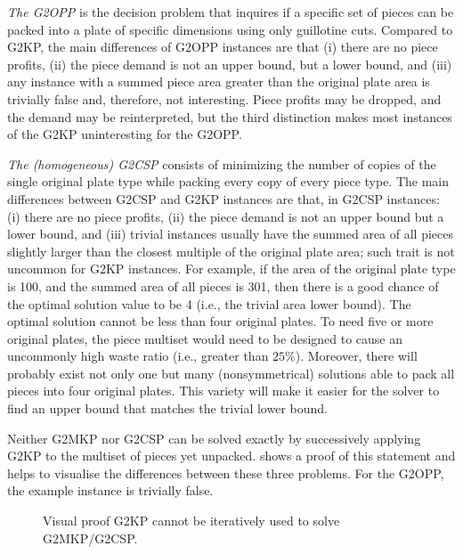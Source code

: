 \emph{The G2OPP} is the decision problem that inquires if a specific set of pieces can be packed into a plate of specific dimensions using only guillotine cuts.
Compared to G2KP, the main differences of G2OPP instances are that (i) there are no piece profits, (ii) the piece demand is not an upper bound, but a lower bound, and (iii) any instance with a summed piece area greater than the original plate area is trivially false and, therefore, not interesting.
Piece profits may be dropped, and the demand may be reinterpreted, but the third distinction makes most instances of the G2KP uninteresting for the G2OPP.

\emph{The (homogeneous) G2CSP} consists of minimizing the number of copies of the single original plate type while packing every copy of every piece type.
The main differences between G2CSP and G2KP instances are that, in G2CSP instances: (i) there are no piece profits, (ii) the piece demand is not an upper bound but a lower bound, and (iii) trivial instances usually have the summed area of all pieces slightly larger than the closest multiple of the original plate area; such trait is not uncommon for G2KP instances.
For example, if the area of the original plate type is 100, and the summed area of all pieces is 301, then there is a good chance of the optimal solution value to be 4 (i.e., the trivial area lower bound).
The optimal solution cannot be less than four original plates. To need five or more original plates, the piece multiset would need to be designed to cause an uncommonly high waste ratio (i.e., greater than \(25\%\)).
Moreover, there will probably exist not only one but many (nonsymmetrical) solutions able to pack all pieces into four original plates. This variety will make it easier for the solver to find an upper bound that matches the trivial lower bound.

Neither G2MKP nor G2CSP can be solved exactly by successively applying G2KP to the multiset of pieces yet unpacked.
 shows a proof of this statement and helps to visualise the differences between these three problems.
For the G2OPP, the example instance is trivially false.

\begin{figure}[h]
  \caption{Visual proof G2KP cannot be iteratively used to solve G2MKP/G2CSP.}
  \center
  
  \vspace{3mm}
  \label{fig:related_problems_diagram}
\end{figure}

